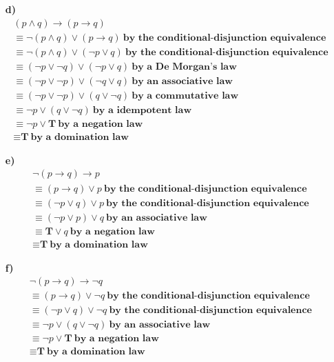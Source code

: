 \documentclass{Axon}
\begin{document}
\begin{enumerate}
    \item[\textbf{d)}] 
    \begin{gather*}
        (p \land q) \to (p \to q) \\
        \equiv \lnot (p \land q) \lor (p \to q) \ \textbf{by the conditional-disjunction equivalence} \\
        \equiv \lnot(p \land q) \lor (\lnot p \lor q) \ \textbf{by the conditional-disjunction equivalence} \\
        \equiv (\lnot p \lor \lnot q) \lor (\lnot p \lor q) \ \textbf{by a De Morgan's law} \\
        \equiv (\lnot p \lor \lnot p) \lor (\lnot q \lor q) \ \textbf{by an associative law} \\
        \equiv (\lnot p \lor \lnot p) \lor (q \lor \lnot q) \ \textbf{by a commutative law} \\
        \equiv \lnot p \lor (q \lor \lnot q) \ \textbf{by a idempotent law} \\
        \equiv \lnot p \lor \textbf{T} \ \textbf{by a negation law} \\
        \equiv \textbf{T} \ \textbf{by a domination law}
    \end{gather*}

    
    \item[\textbf{e)}]
    \begin{gather*}
        \lnot(p \to q) \to p \\
        \equiv (p \to q) \lor p \ \textbf{by the conditional-disjunction equivalence} \\
        \equiv (\lnot p \lor q) \lor p \ \textbf{by the conditional-disjunction equivalence} \\
        \equiv (\lnot p \lor p) \lor q \ \textbf{by an associative law} \\
        \equiv \textbf{T} \lor q \ \textbf{by a negation law} \\
        \equiv \textbf{T} \ \textbf{by a domination law}
    \end{gather*}
    
    \item[\textbf{f)}]
    \begin{gather*}
        \lnot(p \to q) \to \lnot q \\
        \equiv (p \to q) \lor \lnot q \ \textbf{by the conditional-disjunction equivalence} \\
        \equiv (\lnot p \lor q) \lor \lnot q  \ \textbf{by the conditional-disjunction equivalence} \\
        \equiv \lnot p \lor (q \lor \lnot q) \ \textbf{by an associative law} \\
        \equiv \lnot p \lor \textbf{T} \ \textbf{by a negation law} \\
        \equiv \textbf{T} \ \textbf{by a domination law}
    \end{gather*}
\end{enumerate}
\end{document}
